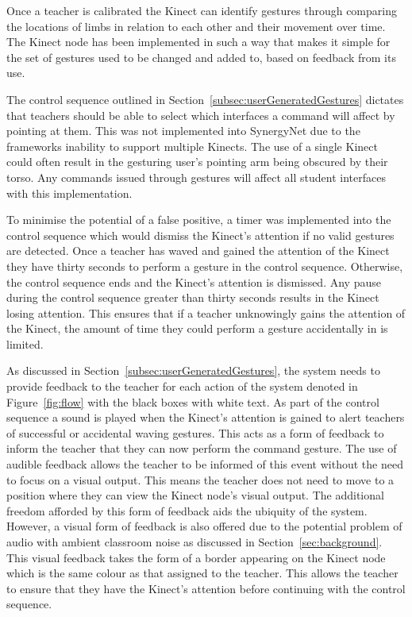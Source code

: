 \documentclass[link]{IWCOMP}
\begin{document}
Once a teacher is calibrated the Kinect can identify gestures through comparing the locations of limbs in relation to each other and their movement over time.
The Kinect node has been implemented in such a way that makes it simple for the set of gestures used to be changed and added to, based on feedback from its use.

The control sequence outlined in Section~\ref{subsec:userGeneratedGestures} dictates that teachers should be able to select which interfaces a command will affect by pointing at them.
This was not implemented into SynergyNet due to the frameworks inability to support multiple Kinects.
The use of a single Kinect could often result in the gesturing user's pointing arm being obscured by their torso.
Any commands issued through gestures will affect all student interfaces with this implementation.

To minimise the potential of a false positive, a timer was implemented into the control sequence which would dismiss the Kinect's attention if no valid gestures are detected.
Once a teacher has waved and gained the attention of the Kinect they have thirty seconds to perform a gesture in the control sequence.
Otherwise, the control sequence ends and the Kinect's attention is dismissed.
Any pause during the control sequence greater than thirty seconds results in the Kinect losing attention.
This ensures that if a teacher unknowingly gains the attention of the Kinect, the amount of time they could perform a gesture accidentally in is limited.

As discussed in Section~\ref{subsec:userGeneratedGestures}, the system needs to provide feedback to the teacher for each action of the system denoted in Figure~\ref{fig:flow} with the black boxes with white text.
As part of the control sequence a sound is played when the Kinect's attention is gained to alert teachers of successful or accidental waving gestures.
This acts as a form of feedback to inform the teacher that they can now perform the command gesture.
The use of audible feedback allows the teacher to be informed of this event without the need to focus on a visual output.
This means the teacher does not need to move to a position where they can view the Kinect node's visual output.
The additional freedom afforded by this form of feedback aids the ubiquity of the system.
However, a visual form of feedback is also offered due to the potential problem of audio with ambient classroom noise as discussed in Section~\ref{sec:background}.
This visual feedback takes the form of a border appearing on the Kinect node which is the same colour as that assigned to the teacher.
This allows the teacher to ensure that they have the Kinect's attention before continuing with the control sequence.
\end{document}
